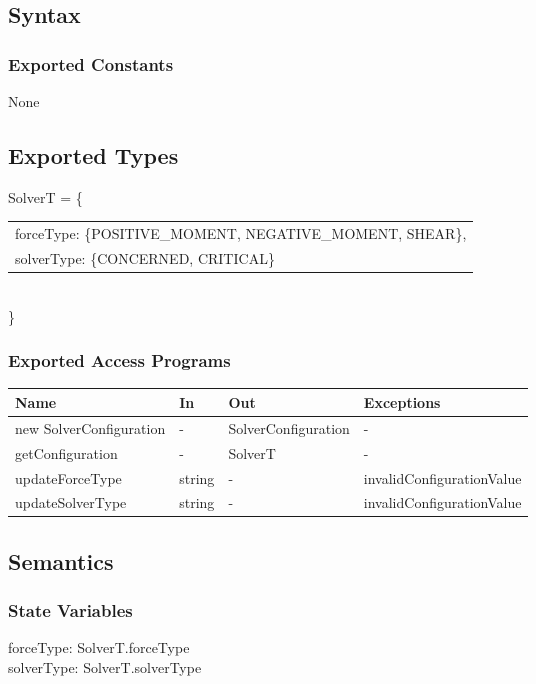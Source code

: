 \documentclass[12pt, titlepage]{article}
\begin{document}
\subsection{Syntax}

\subsubsection{Exported Constants}
None
\subsection{Exported Types}
SolverT = \{\\
    \begin{tabular}{l}
	forceType: \{POSITIVE\_MOMENT, NEGATIVE\_MOMENT,
		SHEAR\},\\
    solverType: \{CONCERNED,
		CRITICAL\}\\
    \end{tabular}
\\\}
\subsubsection{Exported Access Programs}
\begin{center}
\begin{tabular}{p{5cm} p{2cm} p{4cm} p{4cm}}
\hline
\textbf{Name} & \textbf{In} & \textbf{Out} & \textbf{Exceptions} \\
\hline
new SolverConfiguration & - & SolverConfiguration & - \\
\hline
getConfiguration & - & SolverT & - \\
\hline
updateForceType & string & - & invalidConfigurationValue \\
\hline

\hline
updateSolverType & string & - & invalidConfigurationValue \\
\hline

\end{tabular}
\end{center}

\subsection{Semantics}

\subsubsection{State Variables}
forceType: SolverT.forceType\\
solverType: SolverT.solverType
\end{document}
